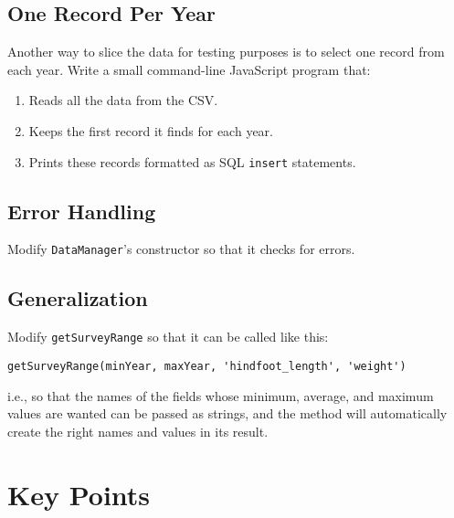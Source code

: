 \subsection*{One Record Per Year}
Another way to slice the data for testing purposes is to select one record from each year.
Write a small command-line JavaScript program that:

\begin{enumerate}
\item
  Reads all the data from the CSV.
\item
  Keeps the first record it finds for each year.
\item
  Prints these records formatted as SQL \texttt{insert} statements.
\end{enumerate}

\subsection*{Error Handling}
Modify \texttt{DataManager}'s constructor so that it checks for errors.

\subsection*{Generalization}
Modify \texttt{getSurveyRange} so that it can be called like this:

\begin{verbatim}
getSurveyRange(minYear, maxYear, 'hindfoot_length', 'weight')
\end{verbatim}

\noindent
i.e., so that the names of the fields whose minimum, average, and maximum values are wanted
can be passed as strings,
and the method will automatically create the right names and values in its result.

\section*{Key Points}


